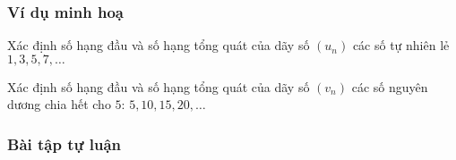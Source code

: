 \subsubsection{Ví dụ minh hoạ}
\begin{vd}%
	Xác định số hạng đầu và số hạng tổng quát của dãy số $(u_n)$ các số tự nhiên lẻ $1, 3, 5, 7, \ldots $
\end{vd}
\begin{vd}%
	Xác định số hạng đầu và số hạng tổng quát của dãy số $(v_n)$ các số nguyên dương chia hết cho $5$: $5,10,15,20,\ldots$
\end{vd}
\subsubsection{Bài tập tự luận}
 
